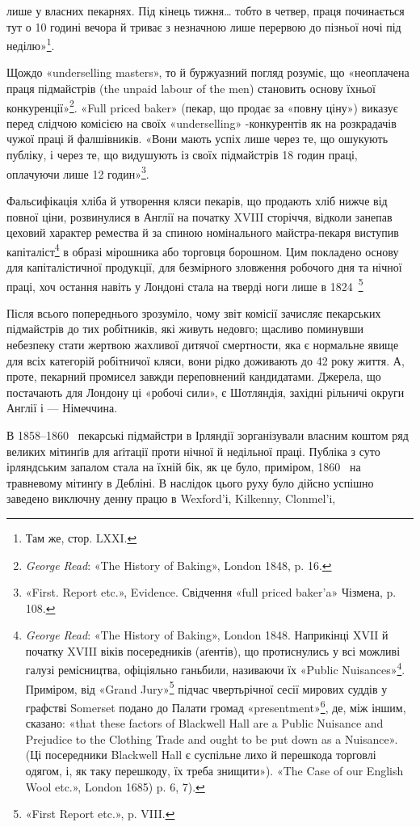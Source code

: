 \parcont{}  %
лише у власних пекарнях. Під кінець тижня\dots{} тобто в четвер,
праця починається тут о 10 годині вечора й триває з незначною
лише перервою до пізньої ночі під неділю»\footnote{
Там же, стор. LXXI.
}.

Щождо «underselling masters», то й буржуазний погляд розуміє,
що «неоплачена праця підмайстрів (the unpaid labour of
the men) становить основу їхньої конкуренції»\footnote{
\emph{George Read}: «The History of Baking», London 1848, p. 16.
}. «Full priced
baker» (пекар, що продає за «повну ціну») виказує перед слідчою
комісією на своїх «underselling» -конкурентів як на розкрадачів
чужої праці й фалшівників. «Вони мають успіх лише
через те, що ошукують публіку, і через те, що видушують із
своїх підмайстрів 18 годин праці, оплачуючи лише 12 годин»\footnote{
«First. Report etc.», Evidence. Свідчення «full priced baker’a» Чізмена,
p. 108.
}.

Фальсифікація хліба й утворення кляси пекарів, що продають
хліб нижче від повної ціни, розвинулися в Англії на початку
XVIII сторіччя, відколи занепав цеховий характер ремества й
за спиною номінального майстра-пекаря виступив капіталіст\footnote{
\emph{George Read}: «The History of Baking», London 1848. Наприкінці
XVII й початку XVIII віків посередників (аґентів), що протиснулись
у всі можливі галузі ремісництва, офіціяльно ганьбили, називаючи
їх «Public Nuisances»\footnote*{суспільним лихом. \emph{Ред.}}.
Приміром, від «Grand Jury»\footnote*{Велике жюрі — суд присяжних. \emph{Ред.}}
підчас чвертьрічної
сесії мирових суддів у графстві Somerset подано до Палати громад
«presentment»\footnote*{внесення. \emph{Ред.}},
де, між іншим, сказано: «that these factors of Blackwell Hall
are a Public Nuisance and Prejudice to the Clothing Trade and ought to be
put down as a Nuisance». (Ці посередники Blackwell Hall є суспільне лихо
й перешкода торговлі одягом, і, як таку перешкоду, їх треба знищити»).
«The Case of our English Wool etc.», London 1685) p. 6, 7).
} в образі мірошника або торговця борошном. Цим покладено основу
для капіталістичної продукції, для безмірного зловження робочого
дня та нічної праці, хоч остання навіть у Лондоні стала на тверді
ноги лише в 1824~\footnote{«First Report etc.», p. VIII.}

Після всього попереднього зрозуміло, чому звіт комісії зачисляє
пекарських підмайстрів до тих робітників, які живуть
недовго; щасливо поминувши небезпеку стати жертвою жахливої
дитячої смертности, яка є нормальне явище для всіх категорій
робітничої кляси, вони рідко доживають до 42 року життя. А, проте,
пекарний промисел завжди переповнений кандидатами. Джерела,
що постачають для Лондону ці «робочі сили», є Шотляндія, західні
рільничі округи Англії і — Німеччина.

В 1858--1860~ пекарські підмайстри в Ірляндії зорганізували
власним коштом ряд великих мітинґів для аґітації проти
нічної й недільної праці. Публіка з суто ірляндським запалом
стала на їхній бік, як це було, приміром, 1860~ на травневому
мітинґу в Дебліні. В наслідок цього руху було дійсно успішно
заведено виключну денну працю в Wexford’і, Kilkenny, Clonmel’i,
\parbreak{}  %

